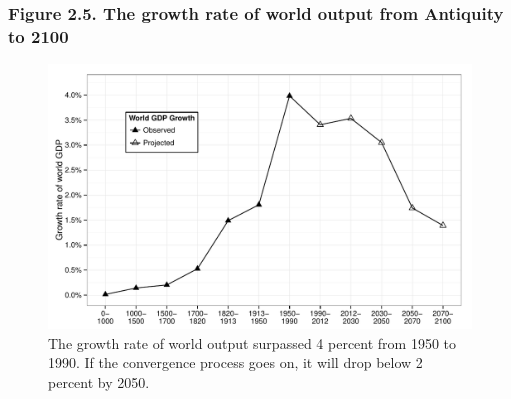 \documentclass[t]{beamer}\usepackage[]{graphicx}\usepackage[]{color}
\newenvironment{knitrout}{}{} %
\begin{document}
\begin{frame}[label=Figure_2_5]
\frametitle{Figure 2.5. The growth rate of world output from Antiquity to 2100}
\begin{figure}[t]
\begin{minipage}[b]{\textwidth}
\centering
\begin{knitrout}\footnotesize
{}\color{fgcolor}

{\centering \includegraphics[width=1\linewidth]{figures/bw/Figure_2_5} 

}



\end{knitrout}
\caption{The growth rate of world output surpassed 4 percent from 1950 to 1990. If the convergence process goes on, it will drop below 2 percent by 2050.}
\end{minipage}
\end{figure}
\end{frame}
\end{document}
